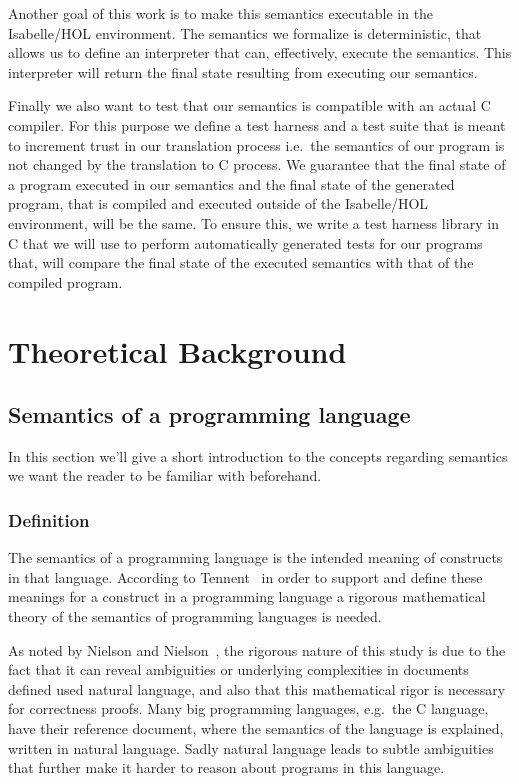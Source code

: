 Another goal of this work is to make this semantics executable in the Isabelle/HOL environment.
The semantics we formalize is deterministic, that allows us to define an interpreter that can, effectively, execute the semantics.
This interpreter will return the final state resulting from executing our semantics.

Finally we also want to test that our semantics is compatible with an actual C compiler.
For this purpose we define a test harness and a test suite that is meant to increment trust in our translation process i.e.\ the semantics of our program is not changed by the translation to C process.
We guarantee that the final state of a program executed in our semantics and the final state of the generated program, that is compiled and executed outside of the Isabelle/HOL environment, will be the same.
To ensure this, we write a test harness library in C that we will use to perform automatically generated tests for our programs that, will compare the final state of the executed semantics with that of the compiled program.


\section{Theoretical Background}

\subsection{Semantics of a programming language}

In this section we'll give a short introduction to the concepts regarding semantics we want the reader to be familiar with beforehand.

\subsubsection{Definition}

The semantics of a programming language is the intended meaning of constructs in that language.
According to Tennent~\parencite{tennent} in order to support and define these meanings for a construct in a programming language a rigorous mathematical theory of the semantics of programming languages is needed.

As noted by Nielson and Nielson~\parencite{nielson}, the rigorous nature of this study is due to the fact that it can reveal ambiguities or underlying complexities in documents defined used natural language, and also that this mathematical rigor is necessary for correctness proofs.
Many big programming languages, e.g.\ the C language, have their reference document, where the semantics of the language is explained, written in natural language.
Sadly natural language leads to subtle ambiguities that further make it harder to reason about programs in this language.

